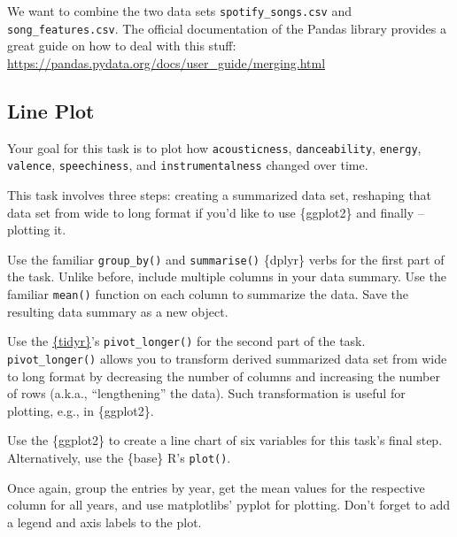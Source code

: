 \documentclass[
  11pt,
]{book}
\newenvironment{tips}[1]
  {
  \begin{itemize}
  \footnotesize
  \renewcommand{\labelitemi}{
    \raisebox{-.7\height}[0pt][0pt]{
      {\setkeys{Gin}{width=3em,keepaspectratio}
        \texttt{[image: images/\#1.png]}}
    }
  }
  \setlength{\fboxsep}{1em}
  \begin{rbox}
  \item
  }
  {
  \end{rbox}
  \end{itemize}
  }
\newenvironment{tipsp}[1]
  {
  \begin{itemize}
  \footnotesize
  \renewcommand{\labelitemi}{
    \raisebox{-.7\height}[0pt][0pt]{
      {\setkeys{Gin}{width=3em,keepaspectratio}
        \texttt{[image: images/\#1.png]}}
    }
  }
  \setlength{\fboxsep}{1em}
  \begin{pbox}
  \item
  }
  {
  \end{pbox}
  \end{itemize}
  }
\begin{document}
\begin{tipsp}p

We want to combine the two data sets \texttt{spotify\_songs.csv} and \texttt{song\_features.csv}.
The official documentation of the Pandas library provides a great guide on how to deal with this stuff:
\url{https://pandas.pydata.org/docs/user_guide/merging.html}

\end{tipsp}

\hypertarget{line-plot}{%
\subsection{Line Plot}\label{line-plot}}

Your goal for this task is to plot how \texttt{acousticness}, \texttt{danceability}, \texttt{energy}, \texttt{valence}, \texttt{speechiness}, and \texttt{instrumentalness} changed over time.

\begin{tips}r

This task involves three steps: creating a summarized data set, reshaping that data set from wide to long format if you'd like to use \{ggplot2\} and finally -- plotting it.

Use the familiar \texttt{group\_by()} and \texttt{summarise()} \{dplyr\} verbs for the first part of the task. Unlike before, include multiple columns in your data summary. Use the familiar \texttt{mean()} function on each column to summarize the data. Save the resulting data summary as a new object.

Use the \href{https://tidyr.tidyverse.org}{\{tidyr\}}'s \texttt{pivot\_longer()} for the second part of the task. \texttt{pivot\_longer()} allows you to transform derived summarized data set from wide to long format by decreasing the number of columns and increasing the number of rows (a.k.a., ``lengthening'' the data). Such transformation is useful for plotting, e.g., in \{ggplot2\}.

Use the \{ggplot2\} to create a line chart of six variables for this task's final step. Alternatively, use the \{base\} R's \texttt{plot()}.

\end{tips}

\begin{tipsp}p

Once again, group the entries by year, get the mean values for the respective column for all years, and use matplotlibs' pyplot for plotting.
Don't forget to add a legend and axis labels to the plot.

\end{tipsp}
\end{document}
